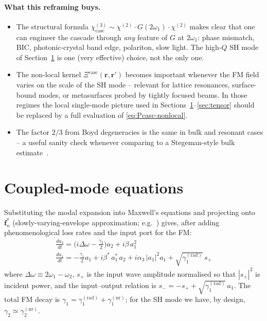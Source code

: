 \documentclass[11pt,a4paper]{article}
\newcommand{\bvec}[1]{\mathbf{#1}}
\newcommand{\f}{\bvec{f}}
\newcommand{\ri}{\bvec{r}}
\newcommand{\chitwo}{\chi^{(2)}}
\newcommand{\chithree}{\chi^{(3)}}
\newcommand{\Dom}{\Delta\omega}
\begin{document}
\paragraph{What this reframing buys.}
\begin{itemize}\setlength{\itemsep}{3pt}
  \item The structural formula
    $\chithree_{\text{casc}}\sim\chitwo\!\cdot G(2\omega_1)\!\cdot\chitwo$
    makes clear that one can engineer the cascade through \emph{any}
    feature of $G$ at $2\omega_1$: phase mismatch, BIC, photonic-crystal
    band edge, polariton, slow light.  The high-$Q$ SH mode of
    Section~\ref{sec:tcmt} is one (very effective) choice, not the only
    one.
  \item The non-local kernel $\Xi^{\text{casc}}(\ri,\ri')$ becomes
    important whenever the FM field varies on the scale of the SH mode
    -- relevant for lattice resonances, surface-bound modes, or
    metasurfaces probed by tightly focused beams.  In those regimes
    the local single-mode picture used in
    Sections~\ref{sec:tcmt}--\ref{sec:tensor} should be replaced by a
    full evaluation of \eqref{eq:Pcasc-nonlocal}.
  \item The factor $2/3$ from Boyd degeneracies is the same in bulk
    and resonant cases -- a useful sanity check whenever comparing to
    a Stegeman-style bulk estimate~\cite{Stegeman1996}.
\end{itemize}

\section{Coupled-mode equations}\label{sec:tcmt}

Substituting the modal expansion into Maxwell's equations and projecting
onto $\f_n^*$ (slowly-varying-envelope approximation; e.g.\
\cite{SuhWangFan2004,Rodriguez2007}) gives, after adding phenomenological
loss rates and the input port for the FM:
\begin{align}
  \boxed{\;\frac{da_2}{dt}=\bigl(i\Dom-\tfrac{\gamma_2}{2}\bigr)a_2+i\beta\,a_1^2\;}
  \label{eq:a2}\\[4pt]
  \boxed{\;\frac{da_1}{dt}=-\tfrac{\gamma_1}{2}a_1
                        +i\beta^*\,a_1^*\,a_2
                        +i\alpha_3\,|a_1|^2 a_1
                        +\sqrt{\gamma_1^{(\text{rad})}}\,s_+\;}
  \label{eq:a1}
\end{align}
where $\Dom\equiv 2\omega_1-\omega_2$, $s_+$ is the input wave amplitude
normalised so that $|s_+|^2$ is incident power, and the input--output
relation is $s_-=-s_++\sqrt{\gamma_1^{(\text{rad})}}\,a_1$.  The total
FM decay is $\gamma_1=\gamma_1^{(\text{rad})}+\gamma_1^{(\text{nr})}$;
for the SH mode we have, by design,
$\gamma_2\simeq\gamma_2^{(\text{nr})}$.
\end{document}
